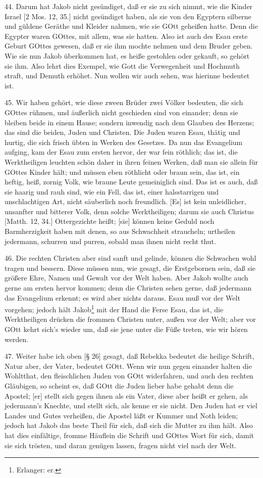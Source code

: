 44. Darum hat Jakob nicht gesündiget, daß er sie zu sich nimmt, wie die Kinder Israel [2 Mos. 12, 35.] nicht gesündiget haben, als sie von den Egyptern silberne und güldene Geräthe und Kleider nahmen, wie sie GOtt geheißen hatte. Denn die Egypter waren GOttes, mit allem, was sie hatten. Also ist auch des Esau erste Geburt GOttes gewesen, daß er sie ihm mochte nehmen und dem Bruder geben. Wie sie nun Jakob überkommen hat, es heiße gestohlen oder gekauft, so gehört sie ihm. Also lehrt dies Exempel, wie Gott die Verwegenheit und Hochmuth straft, und Demuth erhöhet. Nun wollen wir auch sehen, was hierinne bedeutet ist.

45. Wir haben gehört, wie diese zween Brüder zwei Völker bedeuten, die sich GOttes rühmen, und äußerlich nicht geschieden sind von einander; denn sie bleiben beide in einem Hause; sondern inwendig nach dem Glauben des Herzens; das sind die beiden, Juden und Christen. Die Juden waren Esau, thätig und hurtig, die sich frisch übten in Werken des Gesetzes. Da nun das Evangelium aufging, kam der Esau zum ersten hervor, der war fein röthlich; das ist, die Werktheiligen leuchten schön daher in ihren feinen Werken, daß man sie allein für GOttes Kinder hält; und müssen eben röthlicht oder braun sein, das ist, ein heftig, heiß, zornig Volk, wie braune Leute gemeiniglich sind. Das ist es auch, daß sie haarig und rauh sind, wie ein Fell, das ist, einer halsstarrigen und unschlachtigen Art, nicht säuberlich noch freundlich. [Es] ist kein unleidlicher, unsanfter und bitterer Volk, denn solche Werktheiligen; darum sie auch Christus [Matth. 12, 34.] Ottergezichte heißt; [sie] können keine Geduld noch Barmherzigkeit haben mit denen, so aus Schwachheit straucheln; urtheilen jedermann, schurren und purren, sobald man ihnen nicht recht thut.

46. Die rechten Christen aber sind sanft und gelinde, können die Schwachen wohl tragen und bessern. Diese müssen nun, wie gesagt, die Erstgebornen sein, daß sie größere Ehre, Namen und Gewalt vor der Welt haben. Aber Jakob wollte auch gerne am ersten hervor kommen; denn die Christen sehen gerne, daß jedermann das Evangelium erkennt; es wird aber nichts daraus. Esau muß vor der Welt vorgehen; jedoch hält Jakob\footnote{Erlanger: er.} mit der Hand die Ferse Esau, das ist, die Werktheiligen drücken die frommen Christen unter, außen vor der Welt; aber vor GOtt kehrt sich's wieder um, daß sie jene unter die Füße treten, wie wir hören werden.

47. Weiter habe ich oben [§ 26] gesagt, daß Rebekka bedeutet die heilige Schrift, Natur aber, der Vater, bedeutet GOtt. Wenn wir nun gegen einander halten die Wohltthat, den fleischlichen Juden von GOtt widerfahren, und auch den rechten Gläubigen, so scheint es, daß GOtt die Juden lieber habe gehabt denn die Apostel; [er] stellt sich gegen ihnen als ein Vater, diese aber heißt er gehen, als jedermann's Knechte, und stellt sich, als kenne er sie nicht. Den Juden hat er viel Landes und Gutes verheißen, die Apostel läßt er Kummer und Noth leiden; jedoch hat Jakob das beste Theil für sich, daß sich die Mutter zu ihm hält. Also hat dies einfältige, fromme Häuflein die Schrift und GOttes Wort für sich, damit sie sich trösten, und daran genügen lassen, fragen nicht viel nach der Welt.

